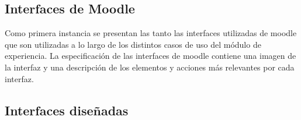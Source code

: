 
\subsection*{Interfaces de Moodle}

 Como primera instancia se presentan las tanto las interfaces utilizadas de moodle
 que son utilizadas a lo largo de los distintos casos de uso del módulo de
 experiencia. La especificación de las interfaces de moodle contiene una imagen de
 la interfaz y una descripción de los elementos y acciones más relevantes por cada
 interfaz.









\subsection*{Interfaces diseñadas}

